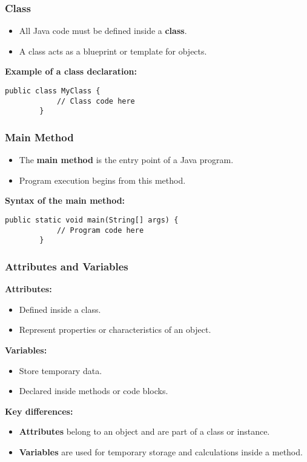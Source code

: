 \documentclass[aspectratio=169, table]{beamer}
\begin{document}
\begin{frame}[fragile]
	\frametitle{Class}
	
	\begin{itemize}
		\item All Java code must be defined inside a \textbf{class}.
		\item A class acts as a blueprint or template for objects.
	\end{itemize}
	
	\textbf{Example of a class declaration:}
	
	\begin{lstlisting}[style=JavaStyle]
		public class MyClass {
			// Class code here
		}
	\end{lstlisting}
\end{frame}

\begin{frame}[fragile]
	\frametitle{Main Method}
	
	\begin{itemize}
		\item The \textbf{main method} is the entry point of a Java program.
		\item Program execution begins from this method.
	\end{itemize}
	
	\textbf{Syntax of the main method:}
	
	\begin{lstlisting}[style=JavaStyle]
		public static void main(String[] args) {
			// Program code here
		}
	\end{lstlisting}
\end{frame}

\begin{frame}[fragile]
	\frametitle{Attributes and Variables}
	
	\textbf{Attributes:}
	\begin{itemize}
		\item Defined inside a class.
		\item Represent properties or characteristics of an object.
	\end{itemize}
	
	\textbf{Variables:}
	\begin{itemize}
		\item Store temporary data.
		\item Declared inside methods or code blocks.
	\end{itemize}
	
	\textbf{Key differences:}
	\begin{itemize}
		\item \textbf{Attributes} belong to an object and are part of a class or instance.
		\item \textbf{Variables} are used for temporary storage and calculations inside a method.
	\end{itemize}
\end{frame}
\end{document}
